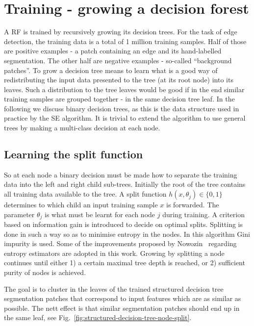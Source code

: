 \section{Training - growing a decision forest}
A RF is trained by recursively growing its decision trees. For the task of edge detection, the training data is a total of 1 million training samples. Half of those are positive examples - a patch containing an edge and its hand-labelled segmentation. The other half are negative examples - so-called ``background patches''. To grow a decision tree means to learn what is a good way of redistributing the input data presented to the tree (at its root node) into its leaves. Such a distribution to the tree leaves would be good if in the end similar training samples are grouped together - in the same decision tree leaf. In the following we discuss binary decision trees, as this is the data structure used in practice by the SE algorithm. It is trivial to extend the algorithm to use general trees by making a multi-class decision at each node. 

\subsection{Learning the split function}
So at each node a binary decision must be made how to separate the training data into the left and right child sub-trees. Initially the root of the tree contains all training data available to the tree. A split function $h(x,\theta_j)\in\{0,1\}$ determines to which child an input training sample $x$ is forwarded. The parameter $\theta_j$ is what must be learnt for each node $j$ during training. A criterion based on information gain is introduced to decide on optimal %
splits. Splitting is done in such a way so as to minimise entropy in the nodes. In this algorithm Gini impurity is used. Some of the improvements proposed by Nowozin~\cite{Nowozin12improvedinformation,nowozin2014decision} regarding entropy estimators are adopted in this work. Growing by splitting a node continues until either 1) a certain maximal tree depth is reached, or 2) sufficient purity of nodes is achieved.

The goal is to cluster in the leaves of the trained structured decision tree segmentation patches that correspond to input features which are as similar as possible. The nett effect is that similar segmentation patches should end up in the same leaf, see Fig.~\ref{fig:structured-decision-tree-node-split}.

